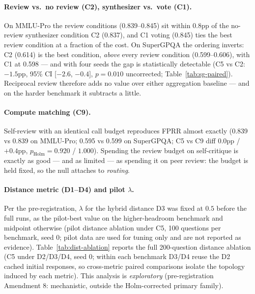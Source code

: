 \documentclass[11pt]{article}
\begin{document}
\paragraph{Review vs.\ no review (C2), synthesizer vs.\ vote (C1).}
On MMLU-Pro the review conditions (0.839--0.845) sit within 0.8pp of the no-review synthesizer condition C2 (0.837), and C1 voting (0.845) ties the best review condition at a fraction of the cost. On SuperGPQA the ordering inverts: C2 (0.614) is the best condition, \emph{above} every review condition (0.599--0.606), with C1 at 0.598 --- and with four seeds the gap is statistically detectable (C5 vs C2: $-1.5$pp, 95\% CI [$-2.6$, $-0.4$], $p=0.010$ uncorrected; Table~\ref{tab:sg-paired}). Reciprocal review therefore adds no value over either aggregation baseline --- and on the harder benchmark it subtracts a little.

\paragraph{Compute matching (C9).}
Self-review with an identical call budget reproduces FPRR almost exactly (0.839 vs 0.839 on MMLU-Pro; 0.595 vs 0.599 on SuperGPQA; C5 vs C9 diff $0.0$pp / $+0.4$pp, $p_{\mathrm{Holm}} = 0.920$ / $1.000$). Spending the review budget on self-critique is exactly as good --- and as limited --- as spending it on peer review: the budget is held fixed, so the null attaches to \emph{routing}.

\paragraph{Distance metric (D1--D4) and pilot $\lambda$.}
Per the pre-registration, $\lambda$ for the hybrid distance D3 was fixed at $0.5$ before the full runs, as the pilot-best value on the higher-headroom benchmark and midpoint otherwise (pilot distance ablation under C5, 100 questions per benchmark, seed 0; pilot data are used for tuning only and are not reported as evidence). Table~\ref{tab:dist-ablation} reports the full 200-question distance ablation (C5 under D2/D3/D4, seed 0; within each benchmark D3/D4 reuse the D2 cached initial responses, so cross-metric paired comparisons isolate the topology induced by each metric). This analysis is \emph{exploratory} (pre-registration Amendment 8: mechanistic, outside the Holm-corrected primary family).
\end{document}
